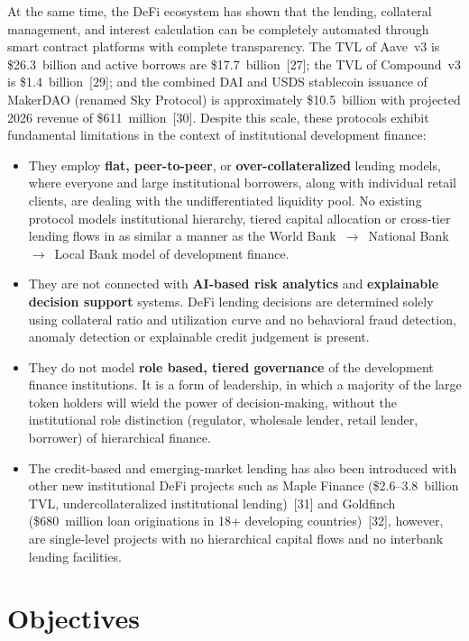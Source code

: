 \documentclass[12pt,a4paper]{report}
\begin{document}
At the same time, the DeFi ecosystem has shown that the lending, collateral management, and interest calculation can be completely automated through smart contract platforms with complete transparency. The TVL of Aave~v3 is \$26.3~billion and active borrows are \$17.7~billion~[27]; the TVL of Compound~v3 is \$1.4~billion~[29]; and the combined DAI and USDS stablecoin issuance of MakerDAO (renamed Sky Protocol) is approximately \$10.5~billion with projected 2026 revenue of \$611~million~[30]. Despite this scale, these protocols exhibit fundamental limitations in the context of institutional development finance:

\begin{itemize}[noitemsep]
\item They employ \textbf{flat, peer-to-peer}, or \textbf{over-collateralized} lending models, where everyone and large institutional borrowers, along with individual retail clients, are dealing with the undifferentiated liquidity pool. No existing protocol models institutional hierarchy, tiered capital allocation or cross-tier lending flows in as similar a manner as the World Bank~$\to$~National Bank~$\to$~Local Bank model of development finance.
\item They are not connected with \textbf{AI-based risk analytics} and \textbf{explainable decision support} systems. DeFi lending decisions are determined solely using collateral ratio and utilization curve and no behavioral fraud detection, anomaly detection or explainable credit judgement is present.
\item They do not model \textbf{role based, tiered governance} of the development finance institutions. It is a form of leadership, in which a majority of the large token holders will wield the power of decision-making, without the institutional role distinction (regulator, wholesale lender, retail lender, borrower) of hierarchical finance.
\item The credit-based and emerging-market lending has also been introduced with other new institutional DeFi projects such as Maple Finance (\$2.6--3.8~billion TVL, undercollateralized institutional lending)~[31] and Goldfinch (\$680~million loan originations in 18+ developing countries)~[32], however, are single-level projects with no hierarchical capital flows and no interbank lending facilities.
\end{itemize}

\section{Objectives}
\end{document}
